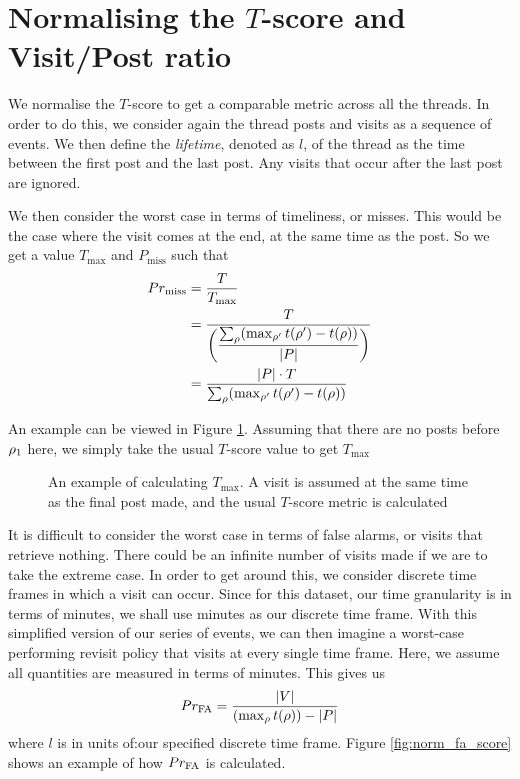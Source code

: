 \section{Normalising the $T$-score and Visit/Post ratio}
We normalise the $T$-score to get a comparable metric across all the threads. In 
order to do this, we consider again the thread posts and visits as a sequence of 
events. We then define the \emph{lifetime}, denoted as $l$, of the thread as the 
time between the first post and the last post. Any visits that occur after the 
last post are ignored.

We then consider the worst case in terms of timeliness, or misses. This would be 
the case where the visit comes at the end, at the same time as the post. So we 
get a value $T_{\max}$ and $P_{\text{miss}}$ such that
\begin{align*}
	\P_{\text{miss}} &= \frac{T}{T_{\max}}\\
							  &= \dfrac{T}{\left(
					\dfrac{%
			\sum_\post (\max_{\post'}t(\post') - t(\post))}{|P|}\right)} \\
					&= \dfrac{|P| \cdot T}{%
		\sum_\post (\max_{\post'}t(\post') - t(\post))}
\end{align*}


An example can be viewed in Figure \ref{fig:norm_t_score}. Assuming that there 
are no posts before $\post_1$ here, we simply take the usual $T$-score value to 
get $T_\text{max}$
\begin{figure}
\begin{center}

	\end{center}
\caption{An example of calculating $T_\text{max}$. A visit is assumed at the 
same time as the final post made, and the usual $T$-score metric is 
calculated}\label{fig:norm_t_score}
\end{figure}
It is difficult to consider the worst case in terms of false alarms, or visits 
that retrieve nothing. There could be an infinite number of visits made if we 
are to take the extreme case. In order to get around this, we consider discrete 
time frames in which a visit can occur. Since for this dataset, our time 
granularity is in terms of minutes, we shall use minutes as our discrete time 
frame.
With this simplified version of our series of events, we can then imagine a 
worst-case performing revisit policy that visits at every single time frame.  
Here, we assume all quantities are measured in terms of minutes. This gives us
\[
	\P_{\text{FA}} = \frac{|V|}{(\max_{\post}t(\post)) - |P|}
\]
where $l$ is in units of:our specified discrete time frame. Figure 
\ref{fig:norm_fa_score} shows an example of how $\P_{\text{FA}}$ is calculated.


